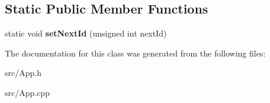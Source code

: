 \subsection*{Static Public Member Functions}
\begin{DoxyCompactItemize}
\item 
\hypertarget{class_app_ac02dab3cd7642d98173bfd6365eb6d9e}{static void {\bfseries set\+Next\+Id} (unsigned int next\+Id)}\label{class_app_ac02dab3cd7642d98173bfd6365eb6d9e}

\end{DoxyCompactItemize}


The documentation for this class was generated from the following files\+:\begin{DoxyCompactItemize}
\item 
src/App.\+h\item 
src/App.\+cpp\end{DoxyCompactItemize}

